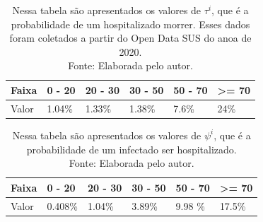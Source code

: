\begin{table}[H]
  \centering
  \begin{tabular}{llllll}
  Faixa & 0 - 20 & 20 - 30 & 30 - 50 & 50 - 70 & \textgreater{}= 70 \\
  \hline
  Valor & 1.04\% & 1.33\%  & 1.38\% & 7.6\%  & 24\%            
  \end{tabular}

  \caption{Nessa tabela são apresentados os valores de $\tau^i$, que é a probabilidade de um hospitalizado morrer. Esses dados foram coletados a partir do Open Data SUS do anoa de 2020. \\Fonte: Elaborada pelo autor.}

  \label{tau}

\end{table}

\begin{table}[H]
  \centering
  \begin{tabular}{llllll}
  Faixa & 0 - 20 & 20 - 30 & 30 - 50 & 50 - 70 & \textgreater{}= 70 \\
  \hline
  Valor & 0.408\% & 1.04\%  & 3.89\% & 9.98
  \%& 17.5\%
  \end{tabular}

  \caption{Nessa tabela são apresentados os valores de $\psi^i$, que é a probabilidade de um infectado ser hospitalizado. \\Fonte: Elaborada pelo autor.}

  \label{psi}

\end{table}